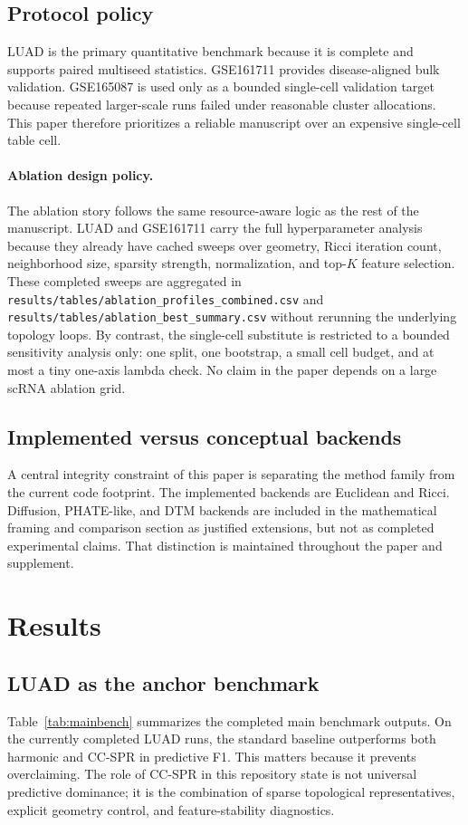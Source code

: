 \documentclass[11pt]{article}
\begin{document}
\subsection{Protocol policy}
LUAD is the primary quantitative benchmark because it is complete and supports paired multiseed statistics. GSE161711 provides disease-aligned bulk validation. GSE165087 is used only as a bounded single-cell validation target because repeated larger-scale runs failed under reasonable cluster allocations. This paper therefore prioritizes a reliable manuscript over an expensive single-cell table cell.

\paragraph{Ablation design policy.}
The ablation story follows the same resource-aware logic as the rest of the manuscript. LUAD and GSE161711 carry the full hyperparameter analysis because they already have cached sweeps over geometry, Ricci iteration count, neighborhood size, sparsity strength, normalization, and top-$K$ feature selection. These completed sweeps are aggregated in \texttt{results/tables/ablation\_profiles\_combined.csv} and \texttt{results/tables/ablation\_best\_summary.csv} without rerunning the underlying topology loops. By contrast, the single-cell substitute is restricted to a bounded sensitivity analysis only: one split, one bootstrap, a small cell budget, and at most a tiny one-axis lambda check. No claim in the paper depends on a large scRNA ablation grid.

\subsection{Implemented versus conceptual backends}
A central integrity constraint of this paper is separating the method family from the current code footprint. The implemented backends are Euclidean and Ricci. Diffusion, PHATE-like, and DTM backends are included in the mathematical framing and comparison section as justified extensions, but not as completed experimental claims. That distinction is maintained throughout the paper and supplement.

\section{Results}
\subsection{LUAD as the anchor benchmark}
Table~\ref{tab:mainbench} summarizes the completed main benchmark outputs. On the currently completed LUAD runs, the standard baseline outperforms both harmonic and CC-SPR in predictive F1. This matters because it prevents overclaiming. The role of CC-SPR in this repository state is not universal predictive dominance; it is the combination of sparse topological representatives, explicit geometry control, and feature-stability diagnostics.
\end{document}
